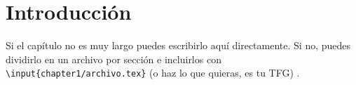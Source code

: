 \chapter{Introducción}\label{chap:chapter1}
Si el capítulo no es muy largo puedes escribirlo aquí directamente. Si no, puedes dividirlo en un archivo por sección e incluirlos con \texttt{\textbackslash input\{chapter1/archivo.tex\}} (o haz lo que quieras, es tu TFG) \cite{einstein}.
